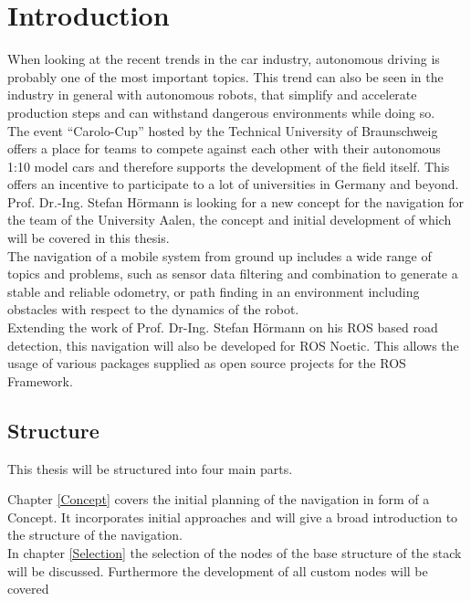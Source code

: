 \chapter{Introduction}
\label{introduction}

When looking at the recent trends in the car industry, autonomous driving is probably one of the most important topics. This trend can also be seen in the industry in general with autonomous robots, that simplify and accelerate production steps and can withstand dangerous environments while doing so.\\

The event ``Carolo-Cup'' hosted by the Technical University of Braunschweig offers a place for teams to compete against each other with their autonomous 1:10 model cars and therefore supports the development of the field itself. This offers an incentive to participate to a lot of universities in Germany and beyond.\\

Prof. Dr.-Ing. Stefan Hörmann is looking for a new concept for the navigation for the team of the University Aalen, the concept and initial development of which will be covered in this thesis.\\

The navigation of a mobile system from ground up includes a wide range of topics and problems, such as sensor data filtering and combination to generate a stable and reliable odometry, or path finding in an environment including obstacles with respect to the dynamics of the robot.\\

Extending the work of Prof. Dr-Ing. Stefan Hörmann on his ROS based road detection, this navigation will also be developed for ROS Noetic. This allows the usage of various packages supplied as open source projects for the ROS Framework.

\section{Structure}

This thesis will be structured into four main parts.

Chapter \ref{Concept} covers the initial planning of the navigation in form of a Concept. It incorporates initial approaches and will give a broad introduction to the structure of the navigation.\\

In chapter \ref{Selection} the selection of the nodes of the base structure of the stack will be discussed. Furthermore the development of all custom nodes will be covered

